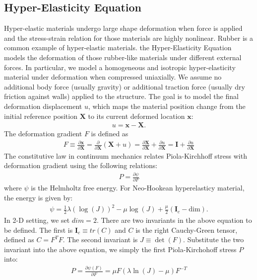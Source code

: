 \subsection{Hyper-Elasticity Equation}
Hyper-elastic materials undergo large shape deformation when force is applied and the stress-strain relation for those materials are highly nonlinear. Rubber is a common example of hyper-elastic materials. the Hyper-Elasticity Equation models the deformation of those rubber-like materials under different external forces. In particular, we model a homogeneous and isotropic hyper-elasticity material under deformation when compressed uniaxially. We assume no additional body force (usually gravity) or additional traction force (usually dry friction against walls) applied to the structure. The goal is to model the final deformation displacement $u$, which maps the material position change from the initial reference position $\mathbf{X}$ to its current deformed location $\bm{x}$:
\begin{align*}
    u = \bm{x} - \mathbf{X}.
\end{align*}
The deformation gradient $F$ is defined as 
\begin{align*}
    F \equiv \frac{\partial \bm{x}}{\partial \mathbf{X}} = \frac{\partial}{\partial \mathbf{X}} \left(\mathbf{X} + u\right) = \frac{\partial \mathbf{X}}{\partial \mathbf{X}} + \frac{\partial u}{\partial \mathbf{X}} = \mathbf{I} + \frac{\partial u}{\partial \mathbf{X}}
\end{align*}
The constitutive law in continuum mechanics relates Piola-Kirchhoff stress with deformation gradient using the following relations:
\begin{align*}
    P = \frac{\partial \psi}{\partial F}
\end{align*}
where $\psi$ is the Helmholtz free energy. For Neo-Hookean hyperelasticy material, the energy is given by:
\begin{align*}
    \psi = \frac{1}{2}\lambda \left(\log(J)\right)^2 - \mu \log(J) + \frac{\mu}{2} (\mathbf{I}_c - \text{dim}).
\end{align*}
In 2-D setting, we set $dim=2$. There are two invariants in the above equation to be defined. The first is $\mathbf{I}_c \equiv tr(C) $ and $C$ is the right Cauchy-Green tensor, defined as $C = F^T F$. The second invariant is  $J \equiv \det (F)$. Substitute the two invariant into the above equation, we simply the first Piola-Kirchohoff stress $P$ into: 
\begin{align*}
    P = \frac{\partial \psi(F)}{\partial F} = \mu F \left(\lambda \ln (J) - \mu\right) F^{-T}
\end{align*}
